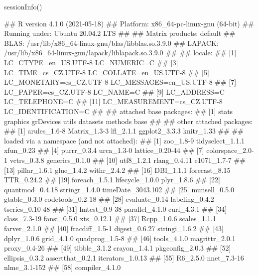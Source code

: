 \documentclass{article}\usepackage[]{graphicx}\usepackage[]{color}
\begin{document}
\begin{Schunk}
\begin{Sinput}
sessionInfo()
\end{Sinput}
\begin{Soutput}
## R version 4.1.0 (2021-05-18)
## Platform: x86_64-pc-linux-gnu (64-bit)
## Running under: Ubuntu 20.04.2 LTS
## 
## Matrix products: default
## BLAS:   /usr/lib/x86_64-linux-gnu/blas/libblas.so.3.9.0
## LAPACK: /usr/lib/x86_64-linux-gnu/lapack/liblapack.so.3.9.0
## 
## locale:
##  [1] LC_CTYPE=en_US.UTF-8       LC_NUMERIC=C              
##  [3] LC_TIME=cs_CZ.UTF-8        LC_COLLATE=en_US.UTF-8    
##  [5] LC_MONETARY=cs_CZ.UTF-8    LC_MESSAGES=en_US.UTF-8   
##  [7] LC_PAPER=cs_CZ.UTF-8       LC_NAME=C                 
##  [9] LC_ADDRESS=C               LC_TELEPHONE=C            
## [11] LC_MEASUREMENT=cs_CZ.UTF-8 LC_IDENTIFICATION=C       
## 
## attached base packages:
## [1] stats     graphics  grDevices utils     datasets  methods   base     
## 
## other attached packages:
## [1] arules_1.6-8  Matrix_1.3-3  lfl_2.1.1     ggplot2_3.3.3 knitr_1.33   
## 
## loaded via a namespace (and not attached):
##  [1] zoo_1.8-9         tidyselect_1.1.1  xfun_0.23        
##  [4] purrr_0.3.4       urca_1.3-0        lattice_0.20-44  
##  [7] colorspace_2.0-1  vctrs_0.3.8       generics_0.1.0   
## [10] utf8_1.2.1        rlang_0.4.11      e1071_1.7-7      
## [13] pillar_1.6.1      glue_1.4.2        withr_2.4.2      
## [16] DBI_1.1.1         forecast_8.15     TTR_0.24.2       
## [19] foreach_1.5.1     lifecycle_1.0.0   plyr_1.8.6       
## [22] quantmod_0.4.18   stringr_1.4.0     timeDate_3043.102
## [25] munsell_0.5.0     gtable_0.3.0      codetools_0.2-18 
## [28] evaluate_0.14     labeling_0.4.2    tseries_0.10-48  
## [31] lmtest_0.9-38     parallel_4.1.0    curl_4.3.1       
## [34] class_7.3-19      fansi_0.5.0       xts_0.12.1       
## [37] Rcpp_1.0.6        scales_1.1.1      farver_2.1.0     
## [40] fracdiff_1.5-1    digest_0.6.27     stringi_1.6.2    
## [43] dplyr_1.0.6       grid_4.1.0        quadprog_1.5-8   
## [46] tools_4.1.0       magrittr_2.0.1    proxy_0.4-26     
## [49] tibble_3.1.2      crayon_1.4.1      pkgconfig_2.0.3  
## [52] ellipsis_0.3.2    assertthat_0.2.1  iterators_1.0.13 
## [55] R6_2.5.0          nnet_7.3-16       nlme_3.1-152     
## [58] compiler_4.1.0
\end{Soutput}
\end{Schunk}
\end{document}
